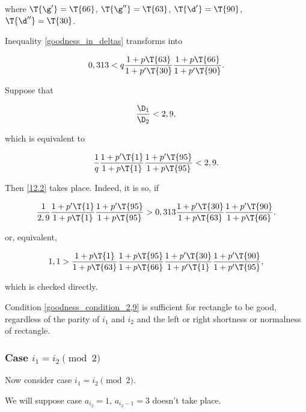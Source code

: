 where
$\T{\g'} = \T{66}$,
$\T{\g''} = \T{63}$,
$\T{\d'} = \T{90}$,
$\T{\d''} = \T{30}$.

Inequality \ref{goodness_in_deltas} transforms into

\begin{equation}\label{12.2}
	0,313 <
	q
	\dfrac{1 + p \T{63}}{1 + p' \T{30}}
	\dfrac{1 + p \T{66}}{1 + p' \T{90}}.
\end{equation}

Suppose that

\begin{equation}\label{goodness_condition_2,9}
	\dfrac{\D_1}{\D_2} < 2,9,
\end{equation}

which is equivalent to

\begin{equation}
	\dfrac{1}{q}
	\dfrac{1 + p' \T{1}}{1 + p \T{1}}
	\dfrac{1 + p' \T{95}}{1 + p \T{95}}
	<
	2,9.
\end{equation}

Then \ref{12.2} takes place. Indeed, it is so, if

\begin{equation*}
	\dfrac{1}{2,9}
	\dfrac{1 + p' \T{1}}{1 + p \T{1}}
	\dfrac{1 + p' \T{95}}{1 + p \T{95}}
	>
	0,313
	\dfrac{1 + p' \T{30}}{1 + p \T{63}}
	\dfrac{1 + p' \T{90}}{1 + p \T{66}}.
\end{equation*}

or, equivalent,

\begin{equation*}
	1,1
	>
	\dfrac{1 + p \T{1}}{1 + p \T{63}}
	\dfrac{1 + p \T{95}}{1 + p \T{66}}
	\dfrac{1 + p' \T{30}}{1 + p' \T{1}}
	\dfrac{1 + p' \T{90}}{1 + p' \T{95}},
\end{equation*}

which is checked directly.

Condition \ref{goodness_condition_2,9} is sufficient for rectangle to be good,
regardless of the parity of $i_1$ and $i_2$ and the left or right shortness or normalness of rectangle.

\subsubsection{Case $i_1 = i_2 \pmod 2$}

Now consider case $i_1 = i_2 \pmod 2$.


We will suppose case $a_{i_2} = 1$, $a_{i_2 - 1} = 3$ doesn't take place.

